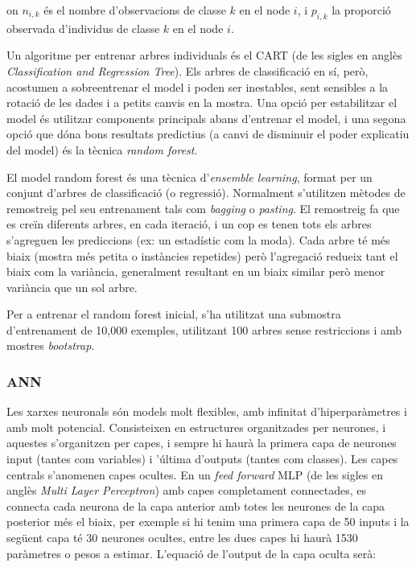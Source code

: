 \documentclass[12pt, spanish]{article}
\begin{document}
on $n_{i,k}$ és el nombre d'observacions de classe $k$ en el node $i$, i $p_{i,k}$ la proporció observada d'individus de classe $k$ en el node $i$. 

Un algoritme per entrenar arbres individuals és el CART (de les sigles en anglès \textit{Classification and Regression Tree}). Els arbres de classificació en sí, però, acostumen a sobreentrenar el model i poden ser inestables, sent sensibles a la rotació de les dades i a petits canvis en la mostra. Una opció per estabilitzar el model és utilitzar components principals abans d'entrenar el model, i una segona opció que dóna bons resultats predictius (a canvi de disminuir el poder explicatiu del model) és la tècnica \textit{random forest}.

El model random forest és una tècnica d'\textit{ensemble learning}, format per un conjunt d'arbres de classificació (o regressió). Normalment s'utilitzen mètodes de remostreig pel seu entrenament tals com \textit{bagging} o \textit{pasting}. El remostreig fa que es creïn diferents arbres, en cada iteració, i un cop es tenen tots els arbres s'agreguen les prediccions (ex: un estadístic com la moda). Cada arbre té més biaix (mostra més petita o instàncies repetides) però  l'agregació redueix tant el biaix com la variància, generalment resultant en un biaix similar però menor variància que un sol arbre.

Per a entrenar el random forest inicial, s'ha utilitzat una submostra d'entrenament de 10,000 exemples, utilitzant 100 arbres sense restriccions i amb mostres \textit{bootstrap}. 

\subsubsection{ANN}

Les xarxes neuronals són models molt flexibles, amb infinitat d'hiperparàmetres i amb molt potencial. Consisteixen en estructures organitzades per neurones, i aquestes s'organitzen per capes, i sempre hi haurà la primera capa de neurones input (tantes com variables) i 'última d'outputs (tantes com classes). Les capes centrals s'anomenen capes ocultes. En un \textit{feed forward} MLP (de les sigles en anglès \textit{Multi Layer Perceptron}) amb capes completament connectades, es connecta cada neurona de la capa anterior amb totes les neurones de la capa posterior més el biaix, per exemple si hi tenim una primera capa de 50 inputs i la següent capa té 30 neurones ocultes, entre les dues capes hi haurà 1530 paràmetres o pesos  a estimar. L'equació de l'output de la capa oculta serà:
\end{document}

